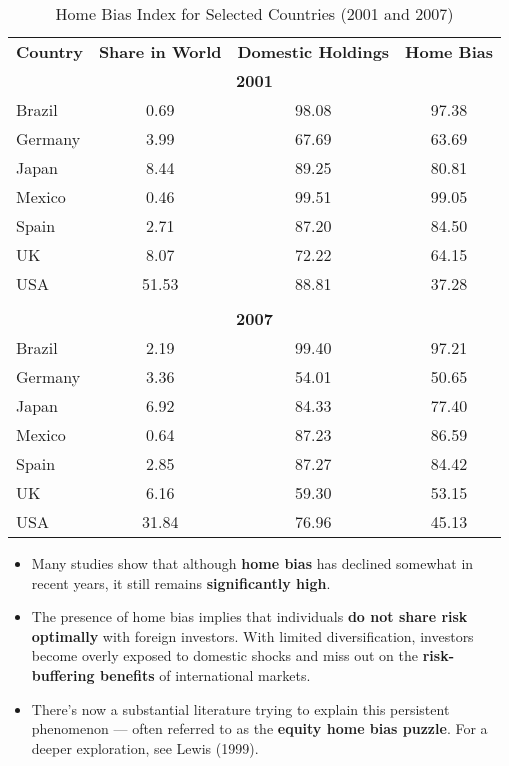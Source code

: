\documentclass[12pt]{article}
\begin{document}
\begin{itemize}
\begin{table}[H]
\centering
\begin{tabular}{lccc}
\textbf{Country} & \textbf{Share in World} & \textbf{Domestic Holdings} & \textbf{Home Bias} \\
\multicolumn{4}{c}{\textbf{2001}} \\
Brazil  & 0.69  & 98.08 & 97.38 \\
Germany & 3.99  & 67.69 & 63.69 \\
Japan   & 8.44  & 89.25 & 80.81 \\
Mexico  & 0.46  & 99.51 & 99.05 \\
Spain   & 2.71  & 87.20 & 84.50 \\
UK      & 8.07  & 72.22 & 64.15 \\
USA     & 51.53 & 88.81 & 37.28 \\
\\
\multicolumn{4}{c}{\textbf{2007}} \\
Brazil  & 2.19  & 99.40 & 97.21 \\
Germany & 3.36  & 54.01 & 50.65 \\
Japan   & 6.92  & 84.33 & 77.40 \\
Mexico  & 0.64  & 87.23 & 86.59 \\
Spain   & 2.85  & 87.27 & 84.42 \\
UK      & 6.16  & 59.30 & 53.15 \\
USA     & 31.84 & 76.96 & 45.13 \\
\end{tabular}
\caption*{Home Bias Index for Selected Countries (2001 and 2007)}
\end{table}

\begin{itemize}
    \item Many studies show that although \textbf{home bias} has declined somewhat in recent years, it still remains \textbf{significantly high}.

    \item The presence of home bias implies that individuals \textbf{do not share risk optimally} with foreign investors. With limited diversification, investors become overly exposed to domestic shocks and miss out on the \textbf{risk-buffering benefits} of international markets.

    \item There’s now a substantial literature trying to explain this persistent phenomenon — often referred to as the \textbf{equity home bias puzzle}. For a deeper exploration, see Lewis (1999).


\end{itemize}
\end{itemize}
\end{document}
